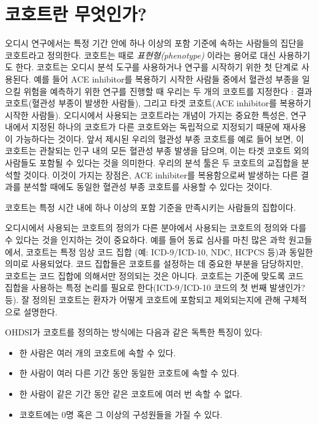 \documentclass[11pt]{book}
\providecommand{\tightlist}{%
  \setlength{\itemsep}{0pt}\setlength{\parskip}{0pt}}
\theoremstyle{definition}
\theoremstyle{definition}
\theoremstyle{definition}
\theoremstyle{remark}
\let\BeginKnitrBlock\begin \let\EndKnitrBlock\end
\begin{document}
\section{코호트란 무엇인가?}\label{-}

오디시 연구에서는 특정 기간 안에 하나 이상의 포함 기준에 속하는 사람들의
집단을 코호트라고 정의한다. 코호트는 때로 \emph{표현형(phenotype)}
이라는 용어로 대신 사용하기도 한다. 코호트는 오디시 분석 도구를
사용하거나 연구를 시작하기 위한 첫 단계로 사용된다. 예를 들어 ACE
inhibitor를 복용하기 시작한 사람들 중에서 혈관성 부종을 일으킬 위험을
예측하기 위한 연구를 진행할 때 우리는 두 개의 코호트를 지정한다 : 결과
코호트(혈관성 부종이 발생한 사람들), 그리고 타겟 코호트(ACE inhibitor를
복용하기 시작한 사람들). 오디시에서 사용되는 코호트라는 개념이 가지는
중요한 특성은, 연구 내에서 지정된 하나의 코호트가 다른 코호트와는
독립적으로 지정되기 때문에 재사용이 가능하다는 것이다. 앞서 제시된
우리의 혈관성 부종 코호트를 예로 들어 보면, 이 코호트는 관찰되는 인구
내의 모든 혈관성 부종 발생을 담으며, 이는 타겟 코호트 외의 사람들도
포함될 수 있다는 것을 의미한다. 우리의 분석 툴은 두 코호트의 교집합을
분석할 것이다. 이것이 가지는 장점은, ACE inhibiter를 복용함으로써
발생하는 다른 결과를 분석할 때에도 동일한 혈관성 부종 코호트를 사용할 수
있다는 것이다.

\BeginKnitrBlock{rmdimportant}
코호트는 특정 시간 내에 하나 이상의 포함 기준을 만족시키는 사람들의
집합이다.
\EndKnitrBlock{rmdimportant}

  오디시에서 사용되는 코호트의
정의가 다른 분야에서 사용되는 코호트의 정의와 다를 수 있다는 것을
인지하는 것이 중요하다. 예를 들어 동료 심사를 마친 많은 과학 원고들에서,
코호트는 특정 임상 코드 집합 (예: ICD-9/ICD-10, NDC, HCPCS 등)과 동일한
의미로 사용되었다. 코드 집합들은 코호트를 설정하는 데 중요한 부분을
담당하지만, 코호트는 코드 집합에 의해서만 정의되는 것은 아니다. 코호트는
기준에 맞도록 코드 집합을 사용하는 특정 논리를 필요로 한다(ICD-9/ICD-10
코드의 첫 번째 발생인가? 등). 잘 정의된 코호트는 환자가 어떻게 코호트에
포함되고 제외되는지에 관해 구체적으로 설명한다. 

 OHDSI가 코호트를 정의하는 방식에는 다음과 같은 독특한
특징이 있다:

\begin{itemize}
\tightlist
\item
  한 사람은 여러 개의 코호트에 속할 수 있다.
\item
  한 사람이 여러 다른 기간 동안 동일한 코호트에 속할 수 있다.
\item
  한 사람이 같은 기간 동안 같은 코호트에 여러 번 속할 수 없다.
\item
  코호트에는 0명 혹은 그 이상의 구성원들을 가질 수 있다.
\end{itemize}
\end{document}
